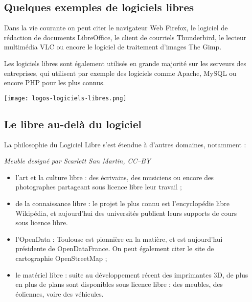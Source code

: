 \subsection{Quelques exemples de logiciels libres}

\begin{minipage}{0.7\textwidth}
Dans la vie courante on peut citer le navigateur Web \textcolor{Cdl}{Firefox}, 
le logiciel de rédaction de documents \textcolor{Cdl}{LibreOffice}, le 
client de courriels \textcolor{Cdl}{Thunderbird}, le lecteur 
multimédia \textcolor{Cdl}{VLC} ou encore le logiciel de traitement 
d’images \textcolor{Cdl}{The Gimp}.

\Separateur

Les logiciels libres sont également utilisés en grande majorité sur 
les serveurs des entreprises, qui utilisent par exemple des 
logiciels comme \textcolor{Cdl}{Apache}, \textcolor{Cdl}{MySQL} ou 
encore \textcolor{Cdl}{PHP} pour les plus connus.
\end{minipage}
\begin{minipage}{0.3\textwidth}
\begin{center}
\texttt{[image: logos-logiciels-libres.png]}
\end{center}
\end{minipage}

\subsection{Le libre au-delà du logiciel}

La philosophie du Logiciel Libre s’est étendue à d’autres domaines,
 notamment :

\begin{minipage}{0.3\textwidth}
\begin{center}
\textit{Meuble designé par Scarlett San Martin, CC--BY}
\end{center}
\end{minipage}
\begin{minipage}{0.7\textwidth}
\begin{itemize}[label=$\bullet$]
\item l'\textcolor{Cdl}{art} et la \textcolor{Cdl}{culture libre} : 
des écrivains, des musiciens 
ou encore des photographes partageant sous licence libre leur travail ;
\item de la \textcolor{Cdl}{connaissance libre} : le projet le plus connu est 
l’encyclopédie libre Wikipédia, et aujourd'hui des universités 
publient leurs supports de cours sous licence libre. 
\item l'\textcolor{Cdl}{OpenData} : Toulouse est pionnière en la matière, 
et est aujourd'hui présidente de OpenDataFrance. On peut également 
citer le site de cartographie \mbox{OpenStreetMap} ;
\item le \textcolor{Cdl}{matériel libre} : suite au développement 
récent des imprimantes 3D, de plus en plus de plans sont disponibles
 sous licence libre : des meubles, des éoliennes, voire des véhicules.
\end{itemize}
\end{minipage}


